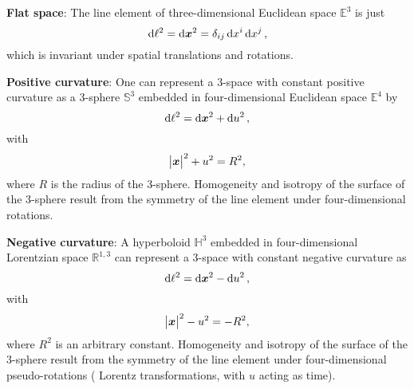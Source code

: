 \begin{hangparas}{24pt}{1}
	\textbf{Flat space}:
	The line element of three-dimensional Euclidean space \(\mathbb{E}^{3}\) is just
	\begin{equation}
		\dd{\ell^{2}}
		= \dd{\vb*{x}^{2}}
		= \delta_{i j} \dd{x^{i}} \dd{x^{j}},
	\end{equation}
	which is invariant under spatial translations and rotations.

	\textbf{Positive curvature}:
	One can represent a 3-space with constant positive curvature as a 3-sphere \(\mathbb{S}^{3}\) embedded in four-dimensional Euclidean space \(\mathbb{E}^{4}\) by
	\begin{equation}
		\dd{\ell^{2}}
		= \dd{\vb*{x}^{2}} + \dd{u^{2}},
	\end{equation}
	with
	\begin{equation}
		\big\lvert\vb*{x}\big\rvert^{2} + u^{2}
		= R^{2},
	\end{equation}
	where \(R\) is the radius of the 3-sphere.
	Homogeneity and isotropy of the surface of the 3-sphere result from the symmetry of the line element under four-dimensional rotations.

	\textbf{Negative curvature}:
	A hyperboloid \(\mathbb{H}^{3}\) embedded in four-dimensional Lorentzian space \(\mathbb{R}^{1,3}\) can represent a 3-space with constant negative curvature as
	\begin{equation}
		\dd{\ell^{2}}
		= \dd{\vb*{x}^{2}} - \dd{u^{2}},
	\end{equation}
	with
	\begin{equation}
		\big\lvert\vb*{x}\big\rvert^{2} - u^{2}
		= -R^{2},
	\end{equation}
	where \(R^{2}\) is an arbitrary constant.
	Homogeneity and isotropy of the surface of the 3-sphere result from the symmetry of the line element under four-dimensional pseudo-rotations (\ie{} Lorentz transformations, with \(u\) acting as time).
\end{hangparas}

